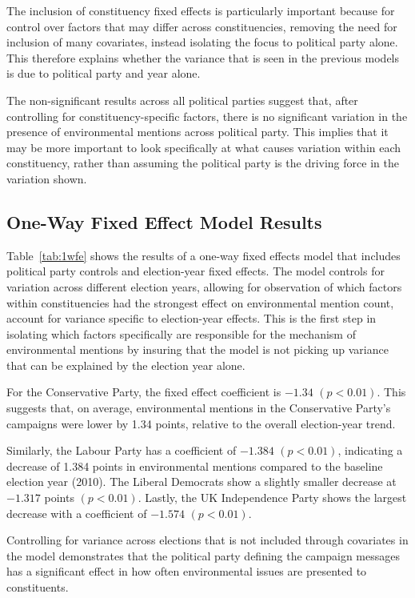 \documentclass[12pt,letterpaper]{article}
\begin{document}
The inclusion of constituency fixed effects is particularly important because for control over factors that may differ across constituencies, removing the need for inclusion of many covariates, instead isolating the focus to political party alone. This therefore explains whether the variance that is seen in the previous models is due to political party and year alone.

The non-significant results across all political parties suggest that, after controlling for constituency-specific factors, there is no significant variation in the presence of environmental mentions across political party. This implies that it may be more important to look specifically at what causes variation within each constituency, rather than assuming the political party is the driving force in the variation shown.


\subsection{One-Way Fixed Effect Model Results}

Table~\ref{tab:1wfe} shows the results of a one-way fixed effects model that includes political party controls and election-year fixed effects. The model controls for variation across different election years, allowing for observation of which factors within constituencies had the strongest effect on environmental mention count, account for variance specific to election-year effects. This is the first step in isolating which factors specifically are responsible for the mechanism of environmental mentions by insuring that the model is not picking up variance that can be explained by the election year alone.

For the Conservative Party, the fixed effect coefficient is \(-1.34\) \((p < 0.01)\). This suggests that, on average, environmental mentions in the Conservative Party's campaigns were lower by 1.34 points, relative to the overall election-year trend.

Similarly, the Labour Party has a coefficient of \(-1.384\) \((p < 0.01)\), indicating a decrease of 1.384 points in environmental mentions compared to the baseline election year (2010). The Liberal Democrats show a slightly smaller decrease at \(-1.317\) points \((p < 0.01)\). Lastly, the UK Independence Party shows the largest decrease with a coefficient of \(-1.574\) \((p < 0.01)\).

Controlling for variance across elections that is not included through covariates in the model demonstrates that the political party defining the campaign messages has a significant effect in how often environmental issues are presented to constituents. 
\end{document}
